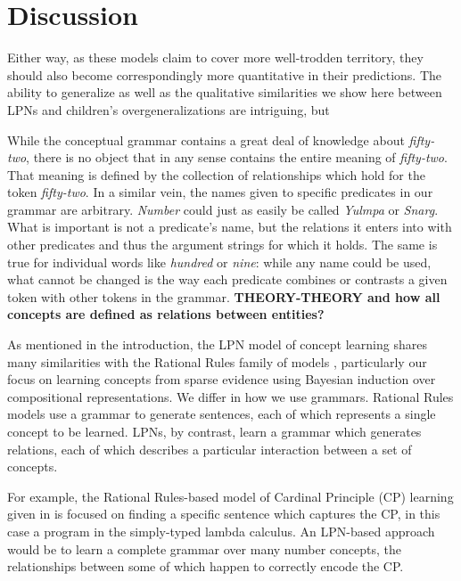 \documentclass[10pt,letterpaper]{article}
\begin{document}
\section{Discussion}


Either way, as these models claim to cover more well-trodden
territory, they should also become correspondingly more quantitative
in their predictions. The ability to generalize as well as the
qualitative similarities we show here between LPNs and children's
overgeneralizations are intriguing, but 


While the conceptual grammar contains a great deal of knowledge about
\emph{fifty-two}, there is no object that in any sense contains the
entire meaning of \emph{fifty-two}. That meaning is defined by the
collection of relationships which hold for the token \emph{fifty-two}.
In a similar vein, the names given to specific predicates in our
grammar are arbitrary. \emph{Number} could just as easily be called
\emph{Yulmpa} or \emph{Snarg}. What is important is not a predicate's
name, but the relations it enters into with other predicates and thus
the argument strings for which it holds. The same is true for
individual words like \emph{hundred} or \emph{nine}: while any name
could be used, what cannot be changed is the way each predicate
combines or contrasts a given token with other tokens in the grammar.
{\bf THEORY-THEORY and how all concepts are defined as relations
  between entities?}

As mentioned in the introduction, the LPN model of concept learning
shares many similarities with the Rational Rules family of models
\citep{goodman2008rational,T.D.Ullman:2012:1b1b6,PianGoodTen2012},
particularly our focus on learning concepts from sparse evidence using
Bayesian induction over compositional representations. We differ in
how we use grammars. Rational Rules models use a grammar to generate
sentences, each of which represents a single concept to be learned.
LPNs, by contrast, learn a grammar which generates relations, each of
which describes a particular interaction between a set of concepts.

For example, the Rational Rules-based model of Cardinal Principle (CP)
learning given in \citep{PianGoodTen2012} is focused on finding a
specific sentence which captures the CP, in this case a program in the
simply-typed lambda calculus. An LPN-based approach would be to learn
a complete grammar over many number concepts, the relationships
between some of which happen to correctly encode the CP.
\end{document}
